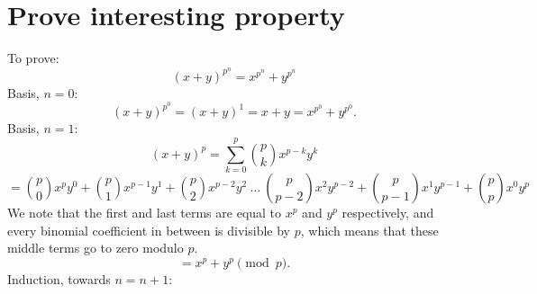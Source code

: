 \documentclass{article}
\begin{document}
\section{Prove interesting property}

To prove:
\[ (x+y)^{p^n} = x^{p^n} + y^{p^n} \]
Basis, $n=0$:
\[ (x+y)^{p^0} = (x+y)^1 = x + y = x^{p^0} + y^{p^0}. \]
Basis, $n=1$:
\[ (x+y)^p = \sum_{k=0}^{p} {p \choose k} x^{p-k} y^{k}  \]
\[ = {p \choose 0} x^{p} y^{0} + {p \choose 1} x^{p-1} y^{1} + {p \choose 2} x^{p-2} y^{2}~ \dots~{p \choose p-2} x^{2} y^{p-2} + {p \choose p-1} x^{1} y^{p-1} + {p \choose p} x^{0} y^{p} \]
We note that the first and last terms are equal to $x^p$ and $y^p$ respectively, and every binomial coefficient in between is divisible by $p$, which means that these middle terms go to zero modulo $p$.
\[ = x^{p} + y^{p} \pmod p. \]
Induction, towards $n=n+1$:
\end{document}
